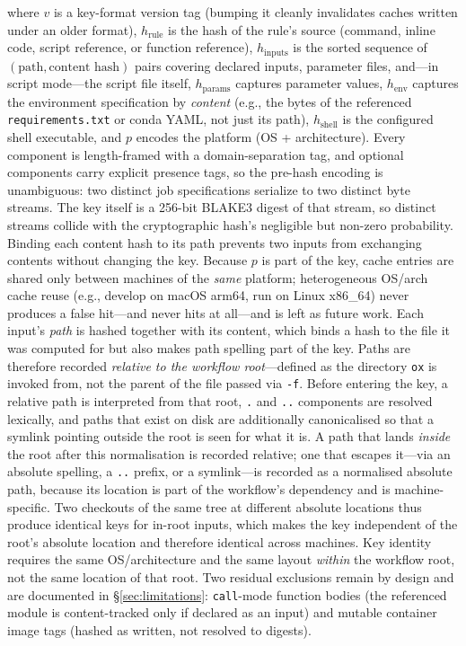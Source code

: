 \documentclass[12pt,a4paper]{article}
\newcommand{\code}[1]{{\texttt{\small\color{inlinecode}#1}}}
\begin{document}
\noindent where $v$ is a key-format version tag (bumping it cleanly
invalidates caches written under an older format), $h_{\text{rule}}$ is
the hash of the rule's source (command, inline code, script reference,
or function reference), $h_{\text{inputs}}$ is the sorted sequence of
$(\text{path}, \text{content hash})$ pairs covering declared inputs,
parameter files, and---in script mode---the script file itself,
$h_{\text{params}}$ captures parameter values, $h_{\text{env}}$ captures
the environment specification by \emph{content} (e.g., the bytes of the
referenced \code{requirements.txt} or conda YAML, not just its path),
$h_{\text{shell}}$ is the configured shell executable, and $p$ encodes
the platform (OS + architecture). Every component is length-framed with
a domain-separation tag, and optional components carry explicit presence
tags, so the pre-hash encoding is unambiguous: two distinct job
specifications serialize to two distinct byte streams. The key itself is
a 256-bit BLAKE3 digest of that stream, so distinct streams collide with
the cryptographic hash's negligible but non-zero probability. Binding
each content hash to its path prevents two inputs from exchanging
contents without changing the key. Because $p$ is part of the key, cache entries are shared only
between machines of the \emph{same} platform; heterogeneous OS/arch
cache reuse (e.g., develop on macOS arm64, run on Linux x86\_64) never
produces a false hit---and never hits at all---and is left as future
work. Each input's \emph{path} is hashed together with its content,
which binds a hash to the file it was computed for but also makes path
spelling part of the key. Paths are therefore recorded \emph{relative
to the workflow root}---defined as the directory \code{ox} is invoked
from, not the parent of the file passed via \code{-f}. Before entering
the key, a relative path is interpreted from that root, \code{.} and
\code{..} components are resolved lexically, and paths that exist on
disk are additionally canonicalised so that a symlink pointing outside
the root is seen for what it is. A path that lands \emph{inside} the
root after this normalisation is recorded relative; one that escapes
it---via an absolute spelling, a \code{..} prefix, or a symlink---is
recorded as a normalised absolute path, because its location is part of
the workflow's dependency and is machine-specific. Two checkouts of the
same tree at different absolute locations thus produce identical keys
for in-root inputs, which makes the key independent of the root's
absolute location and therefore identical across machines.
Key identity requires the same OS/architecture and the same layout
\emph{within} the workflow root, not the same location of that root. Two residual exclusions remain by design and are documented in
\S\ref{sec:limitations}: \code{call}-mode function bodies (the referenced
module is content-tracked only if declared as an input) and mutable
container image tags (hashed as written, not resolved to digests).
\end{document}

